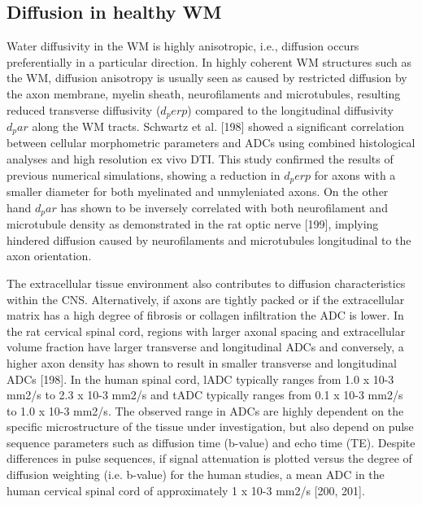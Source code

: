 \subsection{Diffusion in healthy WM}
Water diffusivity in the WM is highly anisotropic, i.e., diffusion occurs preferentially in a particular direction. In highly coherent WM structures such as the WM, diffusion anisotropy is usually seen as caused by restricted diffusion by the axon membrane, myelin sheath, neurofilaments and microtubules, resulting reduced transverse diffusivity ($d_perp$) compared to the longitudinal diffusivity $d_par$ along the WM tracts. Schwartz et al. [198] showed a significant correlation between cellular morphometric parameters and ADCs using combined histological analyses and high resolution ex vivo DTI.  This study confirmed the results of previous numerical simulations\citep{Ford}, showing a reduction in $d_perp$ for axons with a smaller diameter for both myelinated and unmyleniated axons. On the other hand $d_par$ has shown to be inversely correlated with both neurofilament and microtubule density as demonstrated in the rat optic nerve [199], implying hindered diffusion caused by neurofilaments and microtubules longitudinal to the axon orientation. 

The extracellular tissue environment also contributes to diffusion characteristics within the CNS. Alternatively, if axons are tightly packed or if the extracellular matrix has a high degree of fibrosis or collagen infiltration the ADC is lower.  In the rat cervical spinal cord, regions with larger axonal spacing and extracellular volume fraction have larger transverse and longitudinal ADCs and conversely, a higher axon density has shown to result in smaller transverse and longitudinal ADCs [198]. In the human spinal cord, lADC typically ranges from 1.0 x 10-3 mm2/s to 2.3 x 10-3 mm2/s and tADC typically ranges from 0.1 x 10-3 mm2/s to 1.0 x 10-3 mm2/s. The observed range in ADCs are highly dependent on the specific microstructure of the tissue under investigation, but also depend on pulse sequence parameters such as diffusion time (b-value) and echo time (TE). Despite differences in pulse sequences, if signal attenuation is plotted versus the degree of diffusion weighting (i.e. b-value) for the human studies, a mean ADC in the human cervical spinal cord of approximately 1 x 10-3 mm2/s [200, 201].

